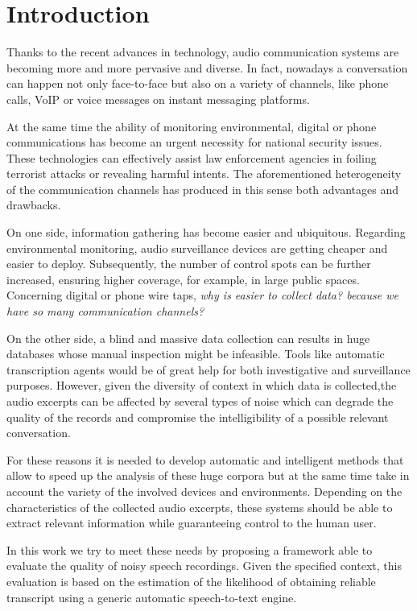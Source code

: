 \section{Introduction}\label{sec:intro}

Thanks to the recent advances in technology, audio communication systems are becoming more and more pervasive and diverse. In fact, nowadays a conversation can happen not only face-to-face but also on a variety of channels, like phone calls, VoIP or voice messages on instant messaging platforms.  

At the same time the ability of monitoring environmental, digital or phone communications has become an urgent necessity for national security issues. These technologies can effectively assist law enforcement agencies in foiling terrorist attacks or revealing harmful intents. The aforementioned heterogeneity of the communication channels has produced in this sense both advantages and drawbacks.  


On one side, information gathering has become easier and ubiquitous. Regarding environmental monitoring, audio surveillance devices are getting cheaper and easier to deploy. Subsequently, the number of control spots can be further increased, ensuring higher coverage, for example, in large public spaces. Concerning digital or phone wire taps, \textit{why is easier to collect data? because we have so many communication channels? }


On the other side, a blind and massive data collection can results in huge databases whose manual inspection might be infeasible. Tools like automatic transcription agents would be of great help for both investigative and surveillance purposes. However, given the diversity of context in which data is collected,the audio excerpts can be affected by several types of noise which can degrade the quality of the records and compromise the intelligibility of a possible relevant conversation. 


For these reasons it is needed to develop automatic and intelligent methods that allow to speed up the analysis of these huge corpora but at the same time take in account the variety of the involved devices and environments. Depending on the characteristics of the collected audio excerpts, these systems should be able to extract relevant information while guaranteeing control to the human user. 


In this work we try to meet these needs by proposing a framework able to evaluate the quality of noisy speech recordings. Given the specified context, this evaluation is based on the estimation of the likelihood of obtaining reliable transcript using a generic automatic speech-to-text engine. 


